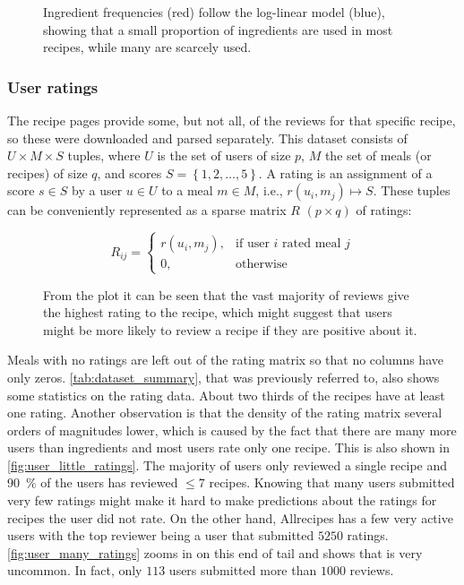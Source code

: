 \begin{figure}[htbp]
	\centering
	
	\caption{Ingredient frequencies (red) follow the log-linear model (blue), showing that a small proportion of ingredients are used in most recipes, while many are scarcely used.}
	\label{fig:ingredient_frequencies}
\end{figure}




\subsubsection{User ratings}
\label{subsubsec:user_ratings}

The recipe pages provide some, but not all, of the reviews for that specific recipe, so these were downloaded and parsed separately.
This dataset consists of $U \times M \times S$ tuples, where $U$ is the set of users of size $p$, $M$ the set of meals (or recipes) of size $q$, and scores $S=\left\{1, 2, \dots, 5\right\}$.
A rating is an assignment of a score $s \in S$ by a user $u \in U$ to a meal $m \in M$, i.e., $r(u_i, m_j) \mapsto S$.
These tuples can be conveniently represented as a sparse matrix $R$ $(p \times q)$ of ratings:

\begin{equation*}
	\tag{Rating matrix}
	R_{ij}=
	\begin{cases}
	    r(u_i, m_j),& \text{if user } i \text{ rated meal } j \\
	    0,& \text{otherwise}
	\end{cases}
\end{equation*}

\begin{figure}[htbp]
	\centering
	
	\caption{From the plot it can be seen that the vast majority of reviews give the highest rating to the recipe, which might suggest that users might be more likely to review a recipe if they are positive about it.}
	\label{fig:user_ratings}
\end{figure}

Meals with no ratings are left out of the rating matrix so that no columns have only zeros.
\cref{tab:dataset_summary}, that was previously referred to, also shows some statistics on the rating data.
About two thirds of the recipes have at least one rating.
Another observation is that the density of the rating matrix several orders of magnitudes lower, which is caused by the fact that there are many more users than ingredients and most users rate only one recipe.
This is also shown in \cref{fig:user_little_ratings}.
The majority of users only reviewed a single recipe and \SI{90}{\percent} of the users has reviewed $\leq 7$ recipes.
Knowing that many users submitted very few ratings might make it hard to make predictions about the ratings for recipes the user did not rate.
On the other hand, Allrecipes has a few very active users with the top reviewer being a user that submitted $\num{5250}$ ratings.
\cref{fig:user_many_ratings} zooms in on this end of tail and shows that is very uncommon.
In fact, only $113$ users submitted more than $\num{1000}$ reviews.

